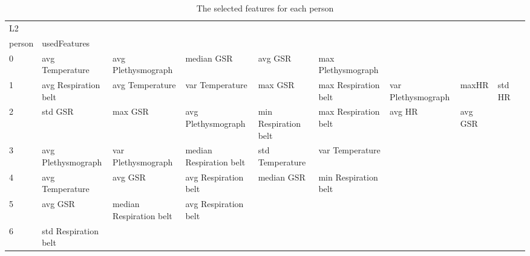 \begin{landscape}
\begin{table}[]
\centering
\caption{The selected features for each person}
\begin{tabular}{l|llllllll}
L2       &                         &                         &                         &                         &                         &                       &                         &                         &                         &         \\
person   & usedFeatures            &                         &                         &                         &                         &                       &                         &                         &                         &         \\
0        & avg Temperature         & avg Plethysmograph      & median GSR              & avg GSR                 & max Plethysmograph      &                       &                         &                         &                         &         \\
1        & avg Respiration belt    & avg Temperature         & var Temperature         & max GSR                 & max Respiration belt    & var Plethysmograph    & maxHR                   & std HR                  &                         &         \\
2        & std GSR                 & max GSR                 & avg Plethysmograph      & min Respiration belt    & max Respiration belt    & avg HR                & avg GSR                 &                         &                         &         \\
3        & avg Plethysmograph      & var Plethysmograph      & median Respiration belt & std Temperature         & var Temperature         &                       &                         &                         &                         &         \\
4        & avg Temperature         & avg GSR                 & avg Respiration belt    & median GSR              & min Respiration belt    &                       &                         &                         &                         &         \\
5        & avg GSR                 & median Respiration belt & avg Respiration belt    &                         &                         &                       &                         &                         &                         &         \\
6        & std Respiration belt    &                         &                         &                         &                         &                       &                         &                         &                         &         \\

\end{tabular}
\end{table}
\end{landscape}
